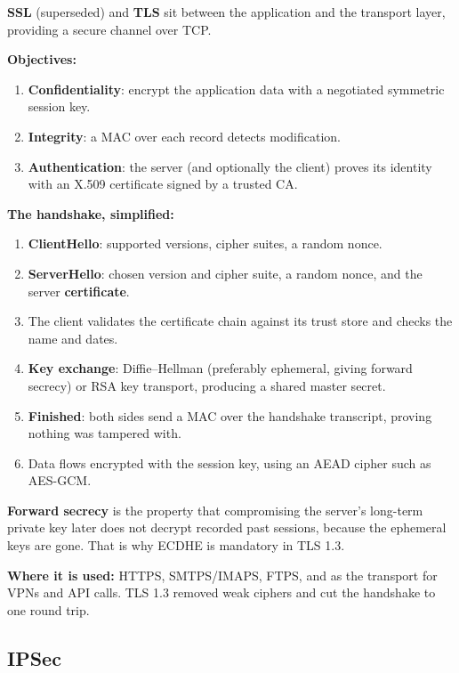 \documentclass[11pt,a4paper]{article}
\begin{document}
\begin{solbox}
\textbf{SSL} (superseded) and \textbf{TLS} sit between the application and the transport layer, providing a secure channel over TCP.

\textbf{Objectives:}
\begin{enumerate}
\item \textbf{Confidentiality}: encrypt the application data with a negotiated symmetric session key.
\item \textbf{Integrity}: a MAC over each record detects modification.
\item \textbf{Authentication}: the server (and optionally the client) proves its identity with an X.509 certificate signed by a trusted CA.
\end{enumerate}

\textbf{The handshake, simplified:}
\begin{enumerate}
\item \textbf{ClientHello}: supported versions, cipher suites, a random nonce.
\item \textbf{ServerHello}: chosen version and cipher suite, a random nonce, and the server \textbf{certificate}.
\item The client validates the certificate chain against its trust store and checks the name and dates.
\item \textbf{Key exchange}: Diffie--Hellman (preferably ephemeral, giving forward secrecy) or RSA key transport, producing a shared master secret.
\item \textbf{Finished}: both sides send a MAC over the handshake transcript, proving nothing was tampered with.
\item Data flows encrypted with the session key, using an AEAD cipher such as AES-GCM.
\end{enumerate}

\textbf{Forward secrecy} is the property that compromising the server's long-term private key later does not decrypt recorded past sessions, because the ephemeral keys are gone. That is why ECDHE is mandatory in TLS 1.3.

\textbf{Where it is used:} HTTPS, SMTPS/IMAPS, FTPS, and as the transport for VPNs and API calls. TLS 1.3 removed weak ciphers and cut the handshake to one round trip.
\end{solbox}

\subsection{IPSec}
\end{document}
